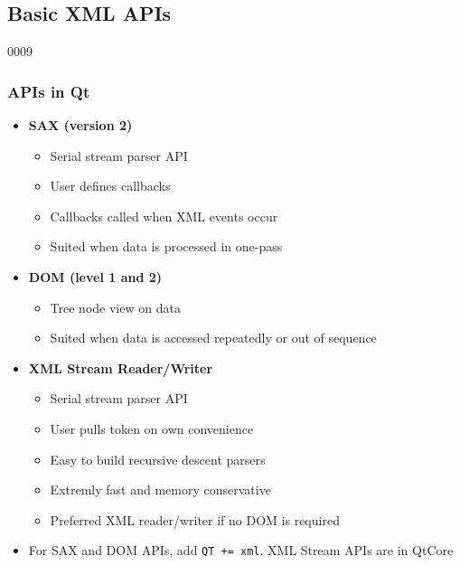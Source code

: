 %
%
%
%

\subsection{Basic XML APIs}


\begin{slide}[fragile]{0009}
\frametitle{ APIs in Qt} \label{xml}
\begin{itemize}
\item \textbf{SAX (version 2)}
  \begin{itemize}
  \item Serial stream parser API
  \item User defines callbacks
  \item Callbacks called when XML events occur
  \item Suited when data is processed in one-pass
  \end{itemize}
\item\textbf{ DOM (level 1 and 2)}
  \begin{itemize}
  \item Tree node view on data
  \item Suited when data is accessed repeatedly or out of sequence 
  \end{itemize}
\item \textbf{XML Stream Reader/Writer}
  \begin{itemize}
  \item Serial stream parser API
  \item User pulls token on own convenience
  \item Easy to build recursive descent parsers
  \item Extremly fast and memory conservative
  \item Preferred XML reader/writer if no DOM is required
  \end{itemize}
\item For SAX and DOM APIs, add \verb!QT += xml!. XML Stream APIs are in QtCore
\end{itemize}
\end{slide}

